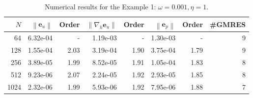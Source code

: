 \documentclass[preprint,11pt]{elsarticle}
\theoremstyle{remark}
\newcommand{\grad}[1]{\nabla #1}
\newcommand{\bm}[1]{\boldsymbol{#1}}
\newcommand{\norm}[1]{\left\lVert #1 \right\rVert}
\begin{document}



\begin{table}[htbp]
\centering
\caption{Numerical results for the Example 1: $\omega = 0.001, \eta = 1$.}
\label{tab:eg1-1}
\begin{tabular}{r r r r r r r r}
\hline
$N$ & $\norm{\bm e_u}$ & Order & $\norm{\nabla_h \bm e_u}$ & Order & $\norm{\bm e_p}$ & Order & \#GMRES \\
\hline
  64  & 6.32e-04 & -    & 1.19e-03 & - & 1.30e-03 & - & 9 \\
 128  & 1.55e-04 & 2.03 & 3.19e-04 & 1.90 & 3.75e-04 & 1.79 & 9 \\
 256  & 3.89e-05 & 1.99 & 8.52e-05 & 1.91 & 1.05e-04 & 1.83 & 8 \\
 512  & 9.23e-06 & 2.07 & 2.24e-05 & 1.92 & 2.93e-05 & 1.85 & 8 \\
1024  & 2.32e-06 & 1.99 & 5.93e-06 & 1.92 & 7.95e-06 & 1.88 & 7 \\
\hline
\end{tabular}
\end{table}
\end{document}
